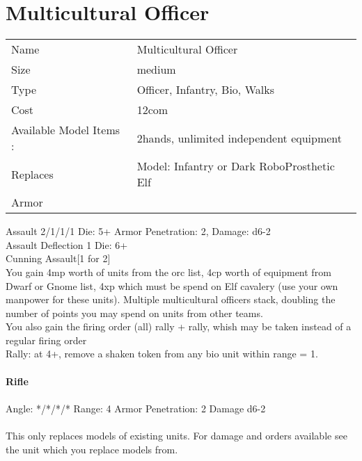 






\pagebreak

\section{ Multicultural Officer }

\begin{tabular}{ll}
  Name & Multicultural Officer \\
  Size & medium\\
  Type & Officer, Infantry, Bio, Walks\\
  Cost & 12com\\
  Available Model Items : &2hands, unlimited independent equipment\\
  Replaces & Model: Infantry or Dark RoboProsthetic Elf\\
  Armor & 
\end{tabular}



Assault 2/1/1/1 Die: 5+ Armor Penetration: 2, Damage: d6-2 \\
Assault Deflection 1 Die: 6+\\
Cunning Assault[1 for 2]
\ \\

You gain 4mp worth of units from the orc list, 4cp worth of equipment from Dwarf or Gnome list, 4xp which must be spend on Elf cavalery (use your own manpower for these units). Multiple multicultural officers stack, doubling the number of points you may spend on units from other teams. \\ You also gain the firing order (all) rally + rally, whish may be taken instead of a regular firing order\\ Rally: at 4+, remove a shaken token from any bio unit within range = 1. \\

\ \\
{\bf Rifle } \\
\ \\
Angle: */*/*/* Range: 4 Armor Penetration: 2 Damage d6-2 \\
\indent  \\





This only replaces models of existing units. For damage and orders available see the unit which you replace models from.



